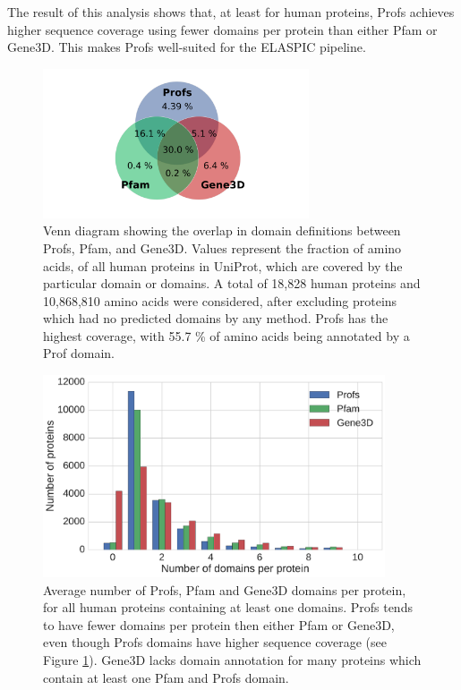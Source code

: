 The result of this analysis shows that, at least for human proteins, Profs achieves higher sequence coverage using fewer domains per protein than either Pfam or Gene3D. This makes Profs well-suited for the ELASPIC pipeline.


\begin{figure}[!tb]
	\centering
	\includegraphics[width=0.7\textwidth]{static/profs/uniprot_coverage_statistics.pdf}
	\caption[Profs, Pfam, and Gene3D domain overlap.]{Venn diagram showing the overlap in domain definitions between Profs, Pfam, and Gene3D. Values represent the fraction of amino acids, of all human proteins in UniProt, which are covered by the particular domain or domains. A total of 18,828 human proteins and 10,868,810 amino acids were considered, after excluding proteins which had no predicted domains by any method. Profs has the highest coverage, with 55.7 \% of amino acids being annotated by a Prof domain.}
	\label{fig:profs_coverage}
\end{figure}


\begin{figure}[!tb]
	\centering
	\includegraphics[width=0.9\textwidth]{static/profs/domains_per_protein.pdf}
	\caption[Profs, Pfam, and Gene3D domains per protein.]{Average number of Profs, Pfam and Gene3D domains per protein, for all human proteins containing at least one domains. Profs tends to have fewer domains per protein then either Pfam or Gene3D, even though Profs domains have higher sequence coverage (see Figure \ref{fig:profs_coverage}). Gene3D lacks domain annotation for many proteins which contain at least one Pfam and Profs domain.}
	\label{fig:profs_domain_size}
\end{figure}



